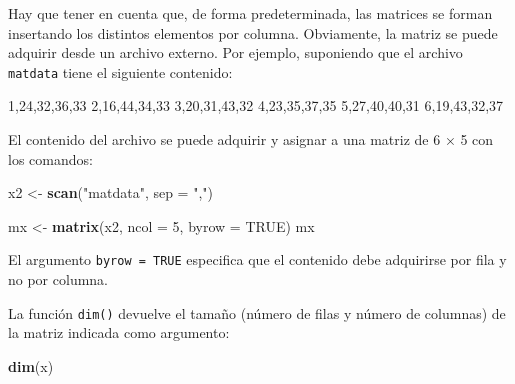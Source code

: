 \documentclass[
]{article}
\newenvironment{Shaded}{\begin{snugshade}}{\end{snugshade}}
\newcommand{\AttributeTok}[1]{\textcolor[rgb]{0.13,0.29,0.53}{#1}}
\newcommand{\ConstantTok}[1]{\textcolor[rgb]{0.56,0.35,0.01}{#1}}
\newcommand{\DecValTok}[1]{\textcolor[rgb]{0.00,0.00,0.81}{#1}}
\newcommand{\FunctionTok}[1]{\textcolor[rgb]{0.13,0.29,0.53}{\textbf{#1}}}
\newcommand{\NormalTok}[1]{#1}
\newcommand{\OtherTok}[1]{\textcolor[rgb]{0.56,0.35,0.01}{#1}}
\newcommand{\StringTok}[1]{\textcolor[rgb]{0.31,0.60,0.02}{#1}}
\begin{document}
Hay que tener en cuenta que, de forma predeterminada, las matrices se forman insertando los distintos elementos por columna. Obviamente, la matriz se puede adquirir desde un archivo externo. Por ejemplo, suponiendo que el archivo \texttt{matdata} tiene el siguiente contenido:

\begin{Shaded}
\begin{Highlighting}[]
\DecValTok{1}\NormalTok{,}\DecValTok{24}\NormalTok{,}\DecValTok{32}\NormalTok{,}\DecValTok{36}\NormalTok{,}\DecValTok{33}
\DecValTok{2}\NormalTok{,}\DecValTok{16}\NormalTok{,}\DecValTok{44}\NormalTok{,}\DecValTok{34}\NormalTok{,}\DecValTok{33}
\DecValTok{3}\NormalTok{,}\DecValTok{20}\NormalTok{,}\DecValTok{31}\NormalTok{,}\DecValTok{43}\NormalTok{,}\DecValTok{32}
\DecValTok{4}\NormalTok{,}\DecValTok{23}\NormalTok{,}\DecValTok{35}\NormalTok{,}\DecValTok{37}\NormalTok{,}\DecValTok{35}
\DecValTok{5}\NormalTok{,}\DecValTok{27}\NormalTok{,}\DecValTok{40}\NormalTok{,}\DecValTok{40}\NormalTok{,}\DecValTok{31}
\DecValTok{6}\NormalTok{,}\DecValTok{19}\NormalTok{,}\DecValTok{43}\NormalTok{,}\DecValTok{32}\NormalTok{,}\DecValTok{37}
\end{Highlighting}
\end{Shaded}

El contenido del archivo se puede adquirir y asignar a una matriz de 6 × 5 con los comandos:

\begin{Shaded}
\begin{Highlighting}[]
\NormalTok{x2 }\OtherTok{\textless{}{-}} \FunctionTok{scan}\NormalTok{(}\StringTok{"matdata"}\NormalTok{, }\AttributeTok{sep =} \StringTok{","}\NormalTok{)}

\NormalTok{mx }\OtherTok{\textless{}{-}} \FunctionTok{matrix}\NormalTok{(x2, }\AttributeTok{ncol =} \DecValTok{5}\NormalTok{, }\AttributeTok{byrow =} \ConstantTok{TRUE}\NormalTok{)}
\NormalTok{mx}
\end{Highlighting}
\end{Shaded}

El argumento \texttt{byrow\ =\ TRUE} especifica que el contenido debe adquirirse por fila y no por columna.

La función \texttt{dim()} devuelve el tamaño (número de filas y número de columnas) de la matriz indicada como argumento:

\begin{Shaded}
\begin{Highlighting}[]
\FunctionTok{dim}\NormalTok{(x)}
\end{Highlighting}
\end{Shaded}
\end{document}

